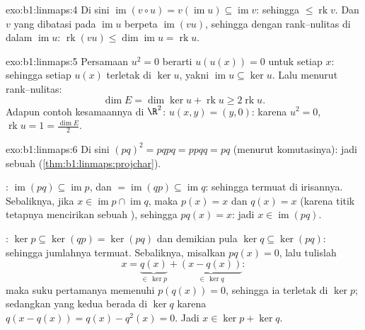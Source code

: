 \begin{solution}{exo:b1:linmaps:4}
Di sini $\operatorname{im}(v \circ u) = v(\operatorname{im} u) \subseteq
\operatorname{im} v$: sehingga  $\leq \operatorname{rk} v$. Dan $v$
yang dibatasi pada $\operatorname{im} u$ berpeta
$\operatorname{im}(vu)$, sehingga dengan rank--nulitas di dalam
$\operatorname{im} u$: $\operatorname{rk}(vu) \leq
\dim\operatorname{im} u = \operatorname{rk} u$.
\end{solution}

\begin{solution}{exo:b1:linmaps:5}
Persamaan $u^2 = 0$ berarti $u(u(x)) = 0$ untuk setiap $x$: sehingga setiap $u(x)$ terletak di
$\ker u$, yakni $\operatorname{im} u \subseteq \ker u$. Lalu menurut
rank--nulitas:
\[
\dim E = \dim\ker u + \operatorname{rk} u \geq 2\operatorname{rk} u .
\]
Adapun contoh kesamaannya di $\R^2$: $u(x, y) = (y, 0)$: karena $u^2 = 0$,
$\operatorname{rk} u = 1 = \frac{\dim E}{2}$.
\end{solution}

\begin{solution}{exo:b1:linmaps:6}
Di sini $(pq)^2 = pqpq = ppqq = pq$ (menurut komutasinya): jadi sebuah 
(\cref{thm:b1:linmaps:projchar}).

: $\operatorname{im}(pq) \subseteq \operatorname{im} p$, dan
$= \operatorname{im}(qp) \subseteq \operatorname{im} q$: sehingga termuat
di irisannya. Sebaliknya, jika $x \in \operatorname{im} p \cap
\operatorname{im} q$, maka $p(x) = x$ dan $q(x) = x$ (karena titik tetapnya
mencirikan  sebuah ), sehingga $pq(x) = x$: jadi $x \in
\operatorname{im}(pq)$.

: $\ker p \subseteq \ker(qp) = \ker(pq)$ dan demikian pula $\ker q
\subseteq \ker(pq)$: sehingga jumlahnya termuat. Sebaliknya, misalkan $pq(x) =
0$, lalu tulislah
\[
x = \underbrace{q(x)}_{\in\, \ker p} +
\underbrace{(x - q(x))}_{\in\, \ker q} :
\]
maka suku pertamanya memenuhi $p(q(x)) = 0$, sehingga ia terletak di $\ker p$; sedangkan
yang kedua berada di $\ker q$ karena $q(x - q(x)) = q(x) - q^2(x) = 0$. Jadi
$x \in \ker p + \ker q$.
\end{solution}

